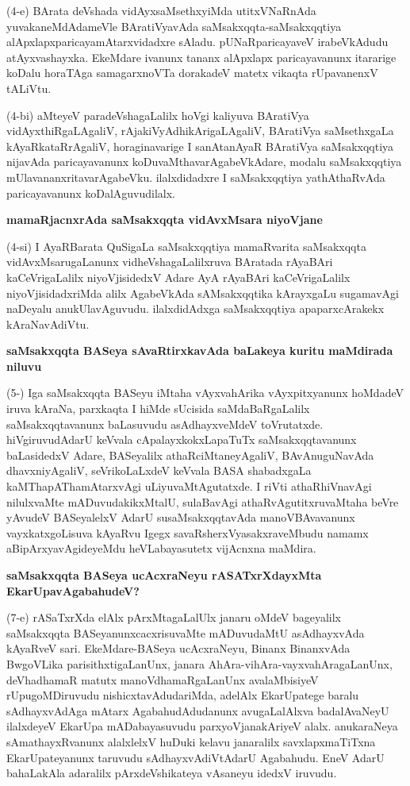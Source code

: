 (4-e) BArata deVshada vidAyxsaMsethxyiMda utitxVNaRnAda yuvakaneMdAdameVle BAratiVyavAda saMsakxqqta-saMsakxqqtiya alApxlapxparicayamAtarxvidadxre sAladu. pUNaRparicayaveV irabeVkAdudu atAyxvashayxka. EkeMdare ivanunx tananx alApxlapx paricayavanunx itararige koDalu horaTAga samagarxnoVTa dorakadeV matetx vikaqta rUpavanenxV tALiVtu.

(4-bi) aMteyeV paradeVshagaLalilx hoVgi kaliyuva BAratiVya vidAyxthiRgaLAgaliV, rAjakiVyAdhikArigaLAgaliV, BAratiVya saMsethxgaLa kAyaRkataRrAgaliV, horaginavarige I sanAtanAyaR BAratiVya saMsakxqqtiya nijavAda paricayavanunx koDuvaMthavarAgabeVkAdare, modalu saMsakxqqtiya mUlavananxritavarAgabeVku. ilalxdidadxre I saMsakxqqtiya yathAthaRvAda paricayavanunx koDalAguvudilalx.

\noindent
\textbf{mamaRjacnxrAda saMsakxqqta vidAvxMsara niyoVjane}\label{page32}

(4-si) I AyaRBarata QuSigaLa saMsakxqqtiya mamaRvarita saMsakxqqta vidAvxMsarugaLanunx vidheVshagaLalilxruva BAratada rAyaBAri kaCeVrigaLalilx niyoVjisidedxV Adare AyA rAyaBAri kaCeVrigaLalilx niyoVjisidadxriMda alilx AgabeVkAda sAMsakxqqtika kArayxgaLu sugamavAgi naDeyalu anukUlavAguvudu. ilalxdidAdxga saMsakxqqtiya apaparxcArakekx kAraNavAdiVtu.

\noindent
\textbf{saMsakxqqta BASeya sAvaRtirxkavAda baLakeya kuritu maMdirada niluvu}\label{page33}

(5-) Iga saMsakxqqta BASeyu iMtaha vAyxvahArika vAyxpitxyanunx hoMdadeV iruva kAraNa, parxkaqta I hiMde sUcisida saMdaBaRgaLalilx saMsakxqqtavanunx baLasuvudu asAdhayxveMdeV toVrutatxde. hiVgiruvudAdarU keVvala cApalayxkokxLapaTuTx saMsakxqqtavanunx baLasidedxV Adare, BASeyalilx athaRciMtaneyAgaliV, BAvAnuguNavAda dhavxniyAgaliV, seVrikoLaLxdeV keVvala BASA shabadxgaLa kaMThapAThamAtarxvAgi uLiyuvaMtAgutatxde. I riVti athaRhiVnavAgi nilulxvaMte mADuvudakikxMtalU, sulaBavAgi athaRvAgutitxruvaMtaha beVre yAvudeV BASeyalelxV AdarU susaMsakxqqtavAda manoVBAvavanunx vayxkatxgoLisuva kAyaRvu Igegx savaRsherxVyasakxraveMbudu namamx aBipArxyavAgideyeMdu heVLabayasutetx vijAcnxna maMdira.

\noindent
\textbf{saMsakxqqta BASeya ucAcxraNeyu rASATxrXdayxMta EkarUpavAgabahudeV?}\label{page33}

(7-e) rASaTxrXda elAlx pArxMtagaLalUlx janaru oMdeV bageyalilx saMsakxqqta BASeyanunxcacxrisuvaMte mADuvudaMtU asAdhayxvAda kAyaRveV sari. EkeMdare-BASeya ucAcxraNeyu, Binanx BinanxvAda BwgoVLika parisithxtigaLanUnx, janara AhAra-vihAra-vayxvahAragaLanUnx, deVhadhamaR matutx manoVdhamaRgaLanUnx avalaMbisiyeV rUpugoMDiruvudu nishicxtavAdudariMda, adelAlx EkarUpatege baralu sAdhayxvAdAga mAtarx AgabahudAdudanunx avugaLalAlxva badalAvaNeyU ilalxdeyeV EkarUpa mADabayasuvudu parxyoVjanakAriyeV alalx. anukaraNeya sAmathayxRvanunx alalxlelxV huDuki kelavu janaralilx savxlapxmaTiTxna EkarUpateyanunx taruvudu sAdhayxvAdiVtAdarU Agabahudu. EneV AdarU bahaLakAla adaralilx pArxdeVshikateya vAsaneyu idedxV iruvudu.

